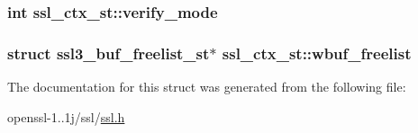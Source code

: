 \hypertarget{structssl__ctx__st_a31f82e30439244c12f51daff24fd40d8}{
\subsubsection[{verify\-\_\-mode}]{\setlength{\rightskip}{0pt plus 5cm}int ssl\-\_\-ctx\-\_\-st\-::verify\-\_\-mode}}\label{structssl__ctx__st_a31f82e30439244c12f51daff24fd40d8}
\hypertarget{structssl__ctx__st_a523c86950f05f20b48fa4e21b39f216f}{
\subsubsection[{wbuf\-\_\-freelist}]{\setlength{\rightskip}{0pt plus 5cm}struct {\bf ssl3\-\_\-buf\-\_\-freelist\-\_\-st}$\ast$ ssl\-\_\-ctx\-\_\-st\-::wbuf\-\_\-freelist}}\label{structssl__ctx__st_a523c86950f05f20b48fa4e21b39f216f}


The documentation for this struct was generated from the following file\-:\begin{DoxyCompactItemize}
\item 
openssl-\/1..\-1j/ssl/\hyperlink{ssl_8h}{ssl.\-h}\end{DoxyCompactItemize}
